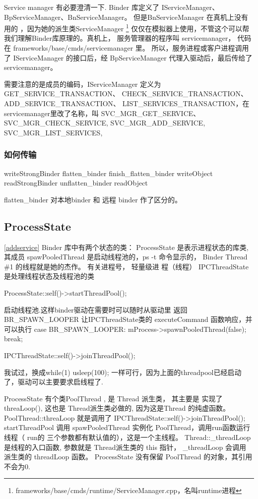 \documentclass[a4paper,11pt]{article}
\begin{document}
    Service manager 有必要澄清一下. Binder 库定义了 IServiceManager、
    BpServiceManager、BnServiceManager。 但是BnServiceManager 在真机上没有用的
    ，因为她的派生类ServiceManager
    \footnote{frameworks/base/cmds/runtime/ServiceManager.cpp，名叫runtime进程}
    仅仅在模拟器上使用，不管这个可以帮我们理解Binder库原理的。真机上， 服务管理器的程序叫 servicemanager， 代码在 
    frameworks/base/cmds/servicemanager 里。 所以，服务进程或客户进程调用了
    IServiceManager 的接口后，经 BpServiceManager 代理入驱动后，最后传给了
    servicemanager。

    需要注意的是成员的编码，IServiceManager 定义为 GET_SERVICE_TRANSACTION、
    CHECK_SERVICE_TRANSACTION、ADD_SERVICE_TRANSACTION、
    LIST_SERVICES_TRANSACTION，在servicemanager里改了名称，叫
    SVC_MGR_GET_SERVICE、SVC_MGR_CHECK_SERVICE, SVC_MGR_ADD_SERVICE, SVC_MGR_LIST_SERVICES,

\subsubsection{如何传输}
writeStrongBinder flatten_binder finish_flatten_binder writeObject 
readStrongBinder unflatten_binder readObject


flatten_binder 对本地binder 和 远程 binder 作了区分的。
\subsection{ProcessState}
\ref{addservice}
Binder 库中有两个状态的类：
ProcessState 是表示进程状态的库类, 其成员 spawPooledThread 是启动线程池的，ps
-t 命令显示的， Binder Thread \#1 的线程就是她的杰作。 有关进程号， 轻量级进
程（线程）
IPCThreadState 是处理线程状态及线程池的类

ProcessState::self()->startThreadPool(); 

  启动线程池.这样binder驱动在需要时可以随时从驱动里
  返回 BR_SPAWN_LOOPER 让IPCThreadState类的
  executeCommand 函数响应，并可以执行
  case BR_SPAWN_LOOPER:
  mProcess->spawnPooledThread(false);
  break;


    IPCThreadState::self()->joinThreadPool();
    
    我试过，换成while(1) usleep(100); 一样可行，因为上面的threadpool已经启动
    了，驱动可以主要要求启线程了.

ProcessState 有个类PoolThread , 是 Thread 派生类， 其主要是 实现了
threaLoop(), 这也是 Thread派生类必做的, 因为这是Thread 的纯虚函数。
PoolThread::threaLoop 就是调用了  
    IPCThreadState::self()->joinThreadPool();
startThreadPool 调用 spawPooledThread  实例化 PoolThread，调用run函数运行线程（ run的
三个参数都有默认值的），这是一个主线程。
Thread::_threadLoop 是线程的入口函数, 参数就是 Thread派生类的 this 指针，
_threadLoop 会调用 派生类的 threadLoop 函数。 ProcessState 没有保留 PoolThread
的对象，其引用不会为0.
\end{document}
